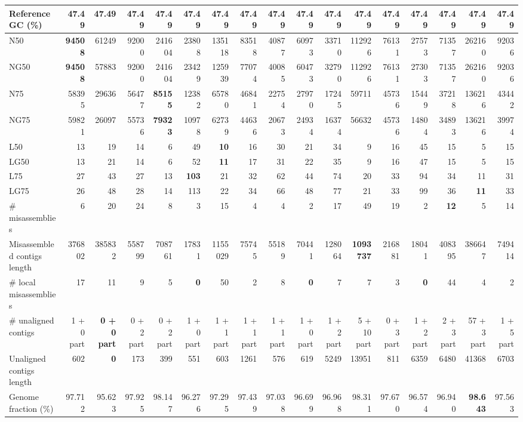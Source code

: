 \documentclass[12pt,a4paper]{article}
\begin{document}
\begin{table}[ht]
\begin{center}
\begin{tabular}{|l*{16}{|r}|}
Reference GC (\%) & 47.49 & 47.49 & 47.49 & 47.49 & 47.49 & 47.49 & 47.49 & 47.49 & 47.49 & 47.49 & 47.49 & 47.49 & 47.49 & 47.49 & 47.49 & 47.49 \\ \hline
N50 & {\bf 94508} & 61249 & 92000 & 241604 & 23808 & 135118 & 83518 & 40877 & 60973 & 33710 & 112926 & 76131 & 27573 & 71357 & 262160 & 92036 \\ \hline
NG50 & {\bf 94508} & 57883 & 92000 & 241604 & 23429 & 125939 & 77074 & 40085 & 60473 & 32790 & 112926 & 76131 & 27303 & 71357 & 262160 & 92036 \\ \hline
N75 & 58395 & 29636 & 56477 & {\bf 85155} & 12382 & 65780 & 46841 & 22754 & 27970 & 17245 & 59711 & 45736 & 15449 & 37218 & 136216 & 43442 \\ \hline
NG75 & 59821 & 26097 & 55736 & {\bf 79323} & 10978 & 62739 & 44636 & 20673 & 24934 & 16374 & 56632 & 45736 & 14804 & 34893 & 136216 & 39974 \\ \hline
L50 & 13 & 19 & 14 & 6 & 49 & {\bf 10} & 16 & 30 & 21 & 34 & 9 & 16 & 45 & 15 & 5 & 15 \\ \hline
LG50 & 13 & 21 & 14 & 6 & 52 & {\bf 11} & 17 & 31 & 22 & 35 & 9 & 16 & 47 & 15 & 5 & 15 \\ \hline
L75 & 27 & 43 & 27 & 13 & {\bf 103} & 21 & 32 & 62 & 44 & 74 & 20 & 33 & 94 & 34 & 11 & 31 \\ \hline
LG75 & 26 & 48 & 28 & 14 & 113 & 22 & 34 & 66 & 48 & 77 & 21 & 33 & 99 & 36 & {\bf 11} & 33 \\ \hline
\# misassemblies & 6 & 20 & 24 & 8 & 3 & 15 & 4 & 4 & 2 & 17 & 49 & 19 & 2 & {\bf 12} & 5 & 14 \\ \hline
Misassembled contigs length & 376802 & 385832 & 558799 & 708761 & 17831 & 1155029 & 75745 & 55189 & 70441 & 128064 & {\bf 1093737} & 216881 & 18041 & 408395 & 386647 & 749414 \\ \hline
\# local misassemblies & 17 & 11 & 9 & 5 & {\bf 0} & 50 & 2 & 8 & {\bf 0} & 7 & 7 & 3 & {\bf 0} & 44 & 4 & 2 \\ \hline
\# unaligned contigs & 1 + 0 part & {\bf 0 + 0 part} & 0 + 2 part & 0 + 2 part & 1 + 0 part & 1 + 1 part & 1 + 1 part & 1 + 1 part & 1 + 0 part & 1 + 2 part & 5 + 10 part & 0 + 3 part & 1 + 2 part & 2 + 3 part & 57 + 3 part & 1 + 5 part \\ \hline
Unaligned contigs length & 602 & {\bf 0} & 173 & 399 & 551 & 603 & 1261 & 576 & 619 & 5249 & 13951 & 811 & 6359 & 6480 & 41368 & 6703 \\ \hline
Genome fraction (\%) & 97.712 & 95.623 & 97.925 & 98.147 & 96.276 & 97.295 & 97.439 & 97.038 & 96.699 & 96.968 & 98.311 & 97.670 & 96.574 & 96.940 & {\bf 98.643} & 97.563 \\ \hline

\end{tabular}
\end{center}
\end{table}
\end{document}
